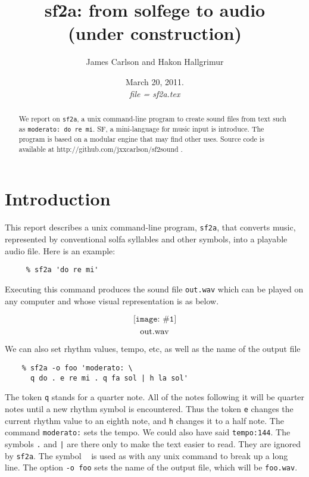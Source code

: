 \documentclass[11pt]{amsart}
\title{sf2a: from solfege to audio\\
(under construction) \\}
\author{James Carlson and Hakon Hallgrimur }
\date{March 20, 2011.\\ 
 \emph{file = sf2a.tex}}
\newcommand{\fig}[3]{  \[\texttt{[image: \#1]}\] \[\hbox{#3}\] }
\begin{document}
\maketitle





\begin{abstract}
We report on {\tt sf2a}, a unix command-line program to create sound files from text such as
{\tt moderato:\ do re mi}.  SF, a mini-language for music input is introduce.  The program is based 
on a modular engine that may find other uses.  Source code is available at 
http://github.com/jxxcarlson/sf2sound .
\end{abstract}


\tableofcontents


\parskip=8pt
\parindent=0pt

\section{Introduction}


This report describes a unix command-line program,
{\tt sf2a}, that  converts music, represented by conventional solfa syllables
and other symbols, into a playable audio file.  Here is an example:
\begin{verbatim}
     % sf2a 'do re mi'
\end{verbatim}
Executing this command produces the sound file {\tt out.wav} which can be played
on any computer and whose visual representation is as below. 

\fig{ex1-wav2}{0.2}{out.wav}

We can also set rhythm values, tempo, etc, as well as the name of the output file
\begin{verbatim}
    % sf2a -o foo 'moderato: \
      q do . e re mi . q fa sol | h la sol'
\end{verbatim}
The token {\tt q} 
stands for a quarter note.  All of  the notes following it will be quarter
notes until a new rhythm symbol is encountered.  Thus the token {\tt e} changes
the current rhythm value to an eighth note, and {\tt h} changes it
to a half note.  The command {\tt moderato:} sets the tempo.
We could also have said {\tt tempo:144}. The symbols {\tt .} and {\tt |}
are there only to make the text easier to read.  They are ignored
by {\tt sf2a}.  The symbol {\tt \ } is used  as with any unix command to
break up a long line.  The option {\tt -o foo} sets the name of the output
file, which will be {\tt foo.wav}.
\end{document}
